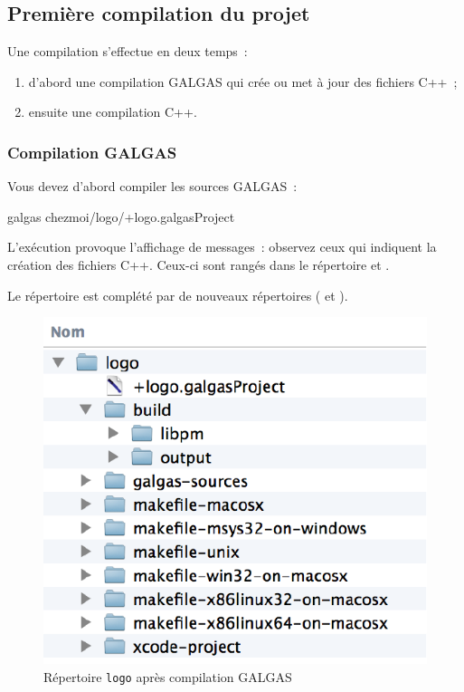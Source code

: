 \subsection{Première compilation du projet}

Une compilation s'effectue en deux temps~:
\begin{enumerate}
  \item d'abord une compilation GALGAS qui crée ou met à jour des fichiers C++~;
  \item ensuite une compilation C++.
\end{enumerate}


\subsubsection{Compilation GALGAS}

Vous devez d'abord compiler les sources GALGAS~:
\begin{SHELL}
galgas chezmoi/logo/+logo.galgasProject
\end{SHELL}

L'exécution provoque l'affichage de messages~: observez ceux qui indiquent la création des fichiers C++. Ceux-ci sont rangés dans le répertoire  et .

Le répertoire  est complété par de nouveaux répertoires ( et ).
\begin{figure}[t]
  \centering
  \includegraphics{partie-utilisation/repertoire-logo.pdf}
  \caption{Répertoire \texttt{logo} après compilation GALGAS}
\end{figure}


